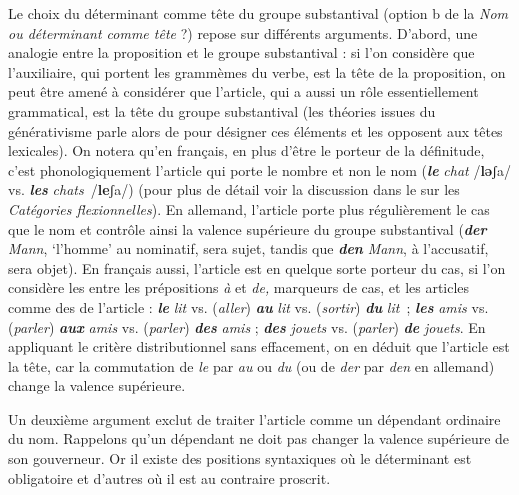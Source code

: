 Le choix du déterminant comme tête du groupe substantival (option b de la  \textit{Nom ou déterminant comme tête} ?) repose sur différents arguments. D’abord, une analogie entre la proposition et le groupe substantival : si l’on considère que l’auxiliaire, qui portent les grammèmes du verbe, est la tête de la proposition, on peut être amené à considérer que l’article, qui a aussi un rôle essentiellement grammatical, est la tête du groupe substantival (les théories issues du générativisme parle alors de  pour désigner ces éléments et les opposent aux têtes lexicales). On notera qu’en français, en plus d’être le porteur de la définitude, c’est phonologiquement l’article qui porte le nombre et non le nom (\textbf{\textit{le}} \textit{chat} /\textbf{lǝ}ʃa/ vs. \textbf{\textit{les}} \textit{chats}~/\textbf{le}ʃa/) (pour plus de détail voir la discussion dans le  sur les \textit{Catégories flexionnelles}). En allemand, l’article porte plus régulièrement le cas que le nom et contrôle ainsi la valence supérieure du groupe substantival (\textbf{\textit{der}} \textit{Mann}, ‘l’homme’ au nominatif, sera sujet, tandis que \textbf{\textit{den}} \textit{Mann}, à l’accusatif, sera objet). En français aussi, l’article est en quelque sorte porteur du cas, si l’on considère les  entre les prépositions \textit{à} et \textit{de,} marqueurs de cas, et les articles comme des  de l’article : \textbf{\textit{le}} \textit{lit} vs. (\textit{aller}) \textbf{\textit{au}} \textit{lit} vs. (\textit{sortir}) \textbf{\textit{du}} \textit{lit~}; \textbf{\textit{les}} \textit{amis} vs. (\textit{parler}) \textbf{\textit{aux}} \textit{amis} vs. (\textit{parler}) \textbf{\textit{des}} \textit{amis} ; \textbf{\textit{des}} \textit{jouets} vs. (\textit{parler}) \textbf{\textit{de}} \textit{jouets}. En appliquant le critère distributionnel sans effacement, on en déduit que l’article est la tête, car la commutation de \textit{le} par \textit{au} ou \textit{du} (ou de \textit{der} par \textit{den} en allemand) change la valence supérieure.

Un deuxième argument exclut de traiter l’article comme un dépendant ordinaire du nom. Rappelons qu’un dépendant ne doit pas changer la valence supérieure de son gouverneur. Or il existe des positions syntaxiques où le déterminant est obligatoire et d’autres où il est au contraire proscrit.

\ea
  \z
\z

